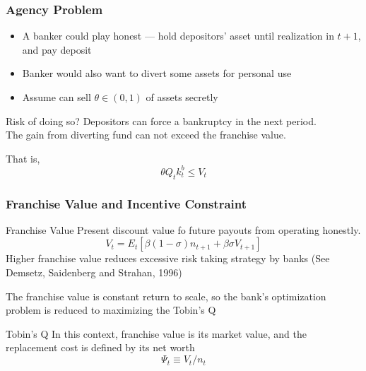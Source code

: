 \begin{frame}
    \frametitle{Agency Problem}
    \begin{itemize}
        \item A banker could play honest --- hold depositors' asset until realization in $t+1$, and pay deposit 
        \item Banker would also want to divert some assets for personal use
        \item Assume can sell $\theta \in (0,1)$ of assets secretly 
    \end{itemize}

    \vfill 
    
    \begin{alertblock}{Risk of doing so? }
        Depositors can force a bankruptcy in the next period. \\
        The gain from diverting fund can not exceed the franchise value.
    \end{alertblock}
    That is, 
    \begin{equation}
        \theta Q_t k^b_t \le V_t
    \end{equation}
\end{frame}

\begin{frame}
    \frametitle{Franchise Value and Incentive Constraint}

    \begin{block}{Franchise Value}
        Present discount value fo future payouts from operating honestly.
        \begin{equation}
            V_t = E_t [\beta(1-\sigma)n_{t+1} +\beta\sigma V_{t+1}] 
        \end{equation} 
        Higher franchise value reduces excessive risk taking strategy by banks (See Demsetz, Saidenberg and Strahan, 1996)       
    \end{block}

    The franchise value is constant return to scale, 
    so the bank's optimization problem is reduced to maximizing the Tobin's Q
    \begin{block}{Tobin's Q}
        In this context, franchise value is its market value, 
        and the replacement cost is defined by its net worth
        \begin{equation*}
            \Psi_t \equiv V_t/n_t
        \end{equation*}
    \end{block}

\end{frame}

